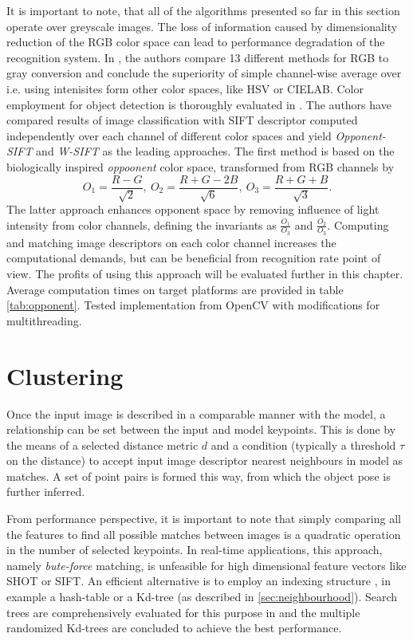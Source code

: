 It is important to note, that all of the algorithms presented so far in this section operate over greyscale images. The loss of information caused by dimensionality reduction of the RGB color space can lead to performance degradation of the recognition system. In \cite{RGB2GREY}, the authors compare 13 different methods for RGB to gray conversion and conclude the superiority of simple channel-wise average over i.e. using intenisites form other color spaces, like HSV or CIELAB. Color employment for object detection is thoroughly evaluated in \cite{ColorComparison}. The authors have compared results of image classification with SIFT descriptor computed independently over each channel of different color spaces and yield \textit{Opponent-SIFT} and \textit{W-SIFT} as the leading approaches. The first method is based on the biologically inspired \textit{oppoonent} color space, transformed from RGB channels by
\begin{equation}
O_1 = \frac{R - G}{\sqrt{2}},\ O_2 = \frac{R + G - 2B}{\sqrt{6}},\ O_3 = \frac{R + G + B}{\sqrt{3}}.
\end{equation}
The latter approach enhances opponent space by removing influence of light intensity from color channels, defining the invariants as $\frac{O_1}{O_3}$ and $\frac{O_2}{O_3}$. Computing and matching image descriptors on each color channel increases the computational demands, but can be beneficial from recognition rate point of view. The profits of using this approach will be evaluated further in this chapter. Average computation times on target platforms are provided in table \ref{tab:opponent}. Tested implementation from OpenCV with modifications for multithreading.


\section{Clustering}
\label{sec:clustering}

Once the input image is described in a comparable manner with the model, a relationship can be set between the input and model keypoints. This is done by the means of a selected distance metric $d$ and a condition (typically a threshold $\tau$ on the distance) to accept input image descriptor nearest neighbours in model as matches. A set of point pairs is formed this way, from which the object pose is further inferred.

From performance perspective, it is important to note that simply comparing all the features to find all possible matches between images is a quadratic operation in the number of selected keypoints. In real-time applications, this approach, namely \textit{bute-force} matching, is unfeasible for high dimensional feature vectors like SHOT or SIFT. An efficient alternative is to employ an indexing structure \cite{szeliski}, in example a hash-table or a Kd-tree (as described in \ref{sec:neighbourhood}). Search trees are comprehensively evaluated for this purpose in \cite{flann} and the multiple randomized Kd-trees are concluded to achieve the best performance.

